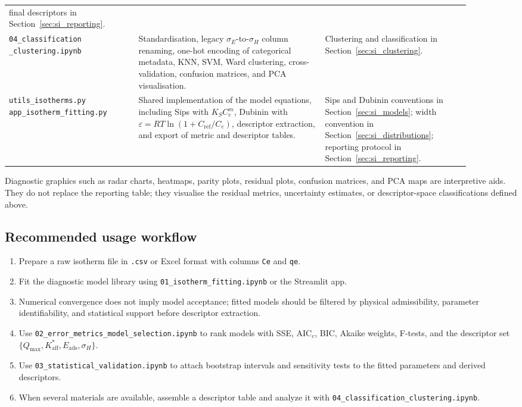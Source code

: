 \documentclass[journal=jacsat,manuscript=article]{achemso}
\begin{document}
\begin{table}[H]
\begin{tabular}{p{0.25\linewidth}p{0.36\linewidth}p{0.29\linewidth}}
		final descriptors in Section~\ref{sec:si_reporting}. \\
		\addlinespace
		\makecell[l]{\texttt{04\_classification}\\\texttt{\_clustering.ipynb}} &
		Standardisation, legacy \(\sigma_E\)-to-\(\sigma_H\) column
		renaming, one-hot encoding of categorical metadata, KNN, SVM,
		Ward clustering, cross-validation, confusion matrices, and PCA
		visualisation. &
		Clustering and classification in Section~\ref{sec:si_clustering}. \\
		\addlinespace
		\makecell[l]{\texttt{utils\_isotherms.py}\\
		\texttt{app\_isotherm\_fitting.py}} &
		Shared implementation of the model equations, including Sips with
		\(K_S C_e^m\), Dubinin with
		\(\varepsilon=RT\ln(1+C_{\mathrm{ref}}/C_e)\), descriptor
		extraction, and export of metric and descriptor tables. &
		Sips and Dubinin conventions in Section~\ref{sec:si_models};
		width convention in Section~\ref{sec:si_distributions};
		reporting protocol in Section~\ref{sec:si_reporting}. \\
		\bottomrule
	\end{tabular}
\end{table}

Diagnostic graphics such as radar charts, heatmaps, parity plots, residual
plots, confusion matrices, and PCA maps are interpretive aids. They do not
replace the reporting table; they visualise the residual metrics, uncertainty
estimates, or descriptor-space classifications defined above.

\subsection{Recommended usage workflow}
\label{sec:si_notebook_workflow}

\begin{enumerate}
	\item Prepare a raw isotherm file in \texttt{.csv} or Excel format with
	columns \texttt{Ce} and \texttt{qe}.
	\item Fit the diagnostic model library using
	\texttt{01\_isotherm\_fitting.ipynb} or the Streamlit app.
	\item Numerical convergence does not imply model acceptance; fitted models should be filtered by physical admissibility, parameter identifiability, and statistical support before descriptor extraction.
	\item Use \texttt{02\_error\_metrics\_model\_selection.ipynb} to rank models
	with SSE, AIC$_c$, BIC, Akaike weights, F-tests, and the descriptor set
	$\{Q_{\max}, K_{\mathrm{aff}}^{\ast}, E_{\mathrm{ads}}, \sigma_H\}$.
	\item Use \texttt{03\_statistical\_validation.ipynb} to attach bootstrap
	intervals and sensitivity tests to the fitted parameters and derived
	descriptors.
	\item When several materials are available, assemble a descriptor table and
	analyze it with \texttt{04\_classification\_clustering.ipynb}.
\end{enumerate}
\end{document}
